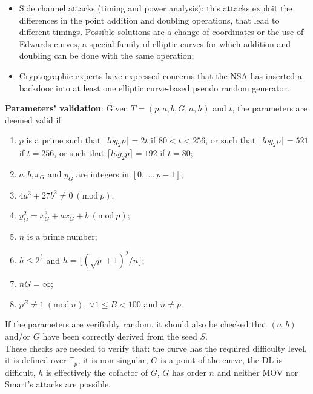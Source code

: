 \begin{itemize}
	\item Side channel attacks (timing and power analysis): this attacks exploit the differences in the point addition and doubling operations, that lead to different timings. Possible solutions are a change of coordinates or the use of Edwards curves, a special family of elliptic curves for which addition and doubling can be done with the same operation;
	\item Cryptographic experts have expressed concerns that the NSA has inserted a backdoor into at least one elliptic curve-based pseudo random generator.
\end{itemize}

\bigskip
\noindent
{\bf Parameters' validation}: Given $T = (p, a, b, G, n, h)$ and $t$, the parameters are deemed valid if:
\begin{enumerate}
	\item $p$ is a prime such that $\lceil log_2p\rceil = 2t$ if $80 < t < 256$, or such that $\lceil log_2p\rceil = 521$ if $t = 256$, or such that $\lceil log_2p\rceil = 192$ if $t = 80$;
	\item $a, b, x_G$ and $y_G$ are integers in $[0, ..., p - 1]$;
	\item $4a^3 + 27b^2 \neq 0 \ (\text{mod} \ p)$;
	\item $y_G^2 = x_G^3 + ax_G + b \ (\text{mod} \ p)$;
	\item $n$ is a prime number;
	\item $h \leq 2^{\frac{t}{8}}$ and $h = \lfloor (\sqrt{p} + 1)^2 / n \rfloor$;
	\item $nG = \infty$;
	\item $p^B \neq 1 \ (\text{mod} \ n), \ \forall 1 \leq B < 100$ and $n \neq p$. 
\end{enumerate}
If the parameters are verifiably random, it should also be checked that $(a, b)$ and/or $G$ have been correctly derived from the seed $S$.
\\
These checks are needed to verify that: the curve has the required difficulty level, it is defined over $\mathbb{F}_p$, it is non singular, $G$ is a point of the curve, the DL is difficult, $h$ is effectively the cofactor of $G$, $G$ has order $n$ and neither MOV nor Smart's attacks are possible.

\bigskip

